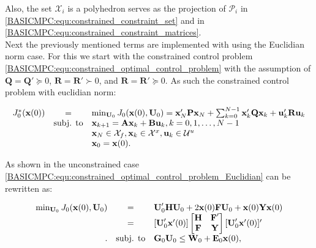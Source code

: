     Also, the set $\mathcal{X}_i$ is a polyhedron serves as the projection of $\mathcal{P}_i$ in \ref{BASICMPC:equ:constrained_constraint_set} and in \ref{BASICMPC:equ:constrained_constraint_matrices}.\\
    Next the previously mentioned terms are implemented with using the Euclidian norm case. For this we start with the constrained control problem \ref{BASICMPC:equ:constrained_optimal_control_problem} with the assumption of $\textbf{Q}=\textbf{Q}'\succeq0$, $\textbf{R}=\textbf{R}'\succ0$, and $\textbf{R}=\textbf{R}'\succeq0$. As such the constrained control problem with euclidian norm:

    \begin{equation}
        \begin{array}{rcl}
            J^*_0(\textbf{x}(0))&=&\min_{\textbf{U}_0}J_0(\textbf{x}(0),\textbf{U}_0)=
            \textbf{x}'_N\textbf{P}\textbf{x}_N+\sum^{N-1}_{k=0}\textbf{x}'_k\textbf{Q}\textbf{x}_k+\textbf{u}'_k\textbf{R}\textbf{u}_k\\
            &\textnormal{subj. to}&\textbf{x}_{k+1}=\textbf{Ax}_{k}+\textbf{Bu}_{k},k=0,1,\dots,N-1\\
            &&\textbf{x}_N\in\mathcal{X}_f,\textbf{x}_k\in\mathcal{X}^x,\textbf{u}_k\in\mathcal{U}^u\\
            &&\textbf{x}_0=\textbf{x}(0).
        \end{array}
        \label{BASICMPC:equ:constrained_optimal_control_problem_Euclidian}
    \end{equation}

    As shown in the unconstrained case \ref{BASICMPC:equ:constrained_optimal_control_problem_Euclidian} can be rewritten as:

\begin{equation}
    \begin{array}{rcl}
            \min_{\textbf{U}_0}J_0(\textbf{x}(0),\textbf{U}_0)&=& \textbf{U}'_0\textbf{H}\textbf{U}_0+2\textbf{x}(0)\textbf{F}\textbf{U}_0+\textbf{x}(0)\textbf{Y}\textbf{x}(0)\\
            &=&[\textbf{U}'_0\textbf{x}'(0)]
            \begin{bmatrix}
            \textbf{H}&\textbf{F}'\\
            \textbf{F}&\textbf{Y}\\
            \end{bmatrix}
            [\textbf{U}'_0\textbf{x}'(0)]'\\.
            &\textnormal{subj. to}&\textbf{G}_0\textbf{U}_0\leq\textbf{W}_0+\textbf{E}_0\textbf{x}(0),
        \end{array}
        \label{BASICMPC:equ:constrained_optimal_control_problem_Euclidian_second form}
    \end{equation}

